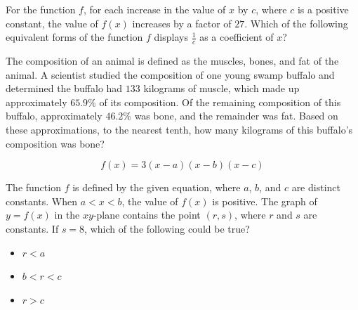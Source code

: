 \noindent\markforreview
\vspace{1em}

For the function $f$, for each increase in the value of $x$ by $c$, where $c$ is a positive constant, the value of $f(x)$ increases by a factor of $27$. Which of the following equivalent forms of the function $f$ displays $\frac{1}{c}$ as a coefficient of $x$?

\vspace{0.75em}


\vspace{2em}
\newpage

\noindent\markforreview
\vspace{1em}

The composition of an animal is defined as the muscles, bones, and fat of the animal. A scientist studied the composition of one young swamp buffalo and determined the buffalo had $133$ kilograms of muscle, which made up approximately $65.9\%$ of its composition. Of the remaining composition of this buffalo, approximately $46.2\%$ was bone, and the remainder was fat. Based on these approximations, to the nearest tenth, how many kilograms of this buffalo's composition was bone?

\vspace{2em}
\newpage

\noindent\markforreview
\vspace{1em}

\[f(x) = 3(x-a)(x-b)(x-c)\]


The function $f$ is defined by the given equation, where $a$, $b$, and $c$ are distinct constants. When $a < x < b$, the value of $f(x)$ is positive. The graph of $y = f(x)$ in the $xy$-plane contains the point $(r, s)$, where $r$ and $s$ are constants. If $s = 8$, which of the following could be true?

\begin{itemize}
\item[I.] $r < a$
\item[II.] $b < r < c$
\item[III.] $r > c$
\end{itemize}

\vspace{0.75em}


